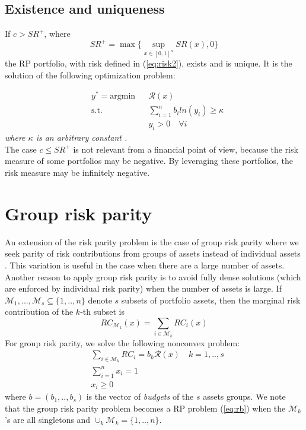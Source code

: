 \subsection{Existence and uniqueness}
\begin{theorem}
If $c > SR^+$, where
\begin{equation}
SR^+ = \max \big\{\sup_{x \in [0,1]^n} SR(x), 0\big\}
\end{equation}
the RP portfolio, with risk defined in (\ref{eq:risk2}), exists and is unique. It is the solution of the following optimization problem:
\end{theorem}
\begin{equation}
\begin{aligned}
& y^* = {\text{argmin}}
&& \mathcal{R}(x)\\
& \text{s.t.}
&&\sum_{i=1}^n b_i ln(y_i) \geq \kappa\\
&&&y_i > 0 \hspace{1em} \forall i
\end{aligned}
\end{equation}
\emph{where $\kappa$ is an arbitrary constant \cite{intr}.}\\
The case $c \leq SR^+$ is not relevant from a financial point of view, because the risk measure of some portfolios may be negative. By leveraging these portfolios, the risk measure may be infinitely negative.

\section{Group risk parity}
An extension of the risk parity problem is the case of group risk parity where we seek parity of risk contributions from groups of assets instead of individual assets \cite{tutuncu}. This variation
is useful in the case when there are a large number of assets. Another reason to apply group risk parity is to avoid fully dense solutions (which are enforced by individual risk parity) when the number of assets is large. If $\mathcal{M}_1, ..., \mathcal{M}_s \subseteq \{1,..,n\}$ denote $s$ subsets of portfolio assets, then the marginal risk contribution of the $k$-th subset is
\begin{equation}
RC_{\mathcal{M}_k}(x) = \sum_{i \in \mathcal{M}_k} RC_i(x)
\end{equation} For group risk parity, we solve the following nonconvex problem:
\begin{equation}
\begin{aligned}
&\sum_{i \in \mathcal{M}_k} RC_i = b_k \mathcal{R}(x) \quad k=1,..,s\\
&\sum_{i=1}^n x_i = 1\\
& x_i \geq 0
\end{aligned}
\end{equation}
where $b=(b_1,..,b_s)$ is the vector of \textit{budgets} of the $s$ assets groups. We note that the group risk parity problem becomes a RP problem (\ref{eq:rb}) when the $\mathcal{M}_k$'s are all singletons and $\cup_k \mathcal{M}_k = \{1,..,n\}$.
